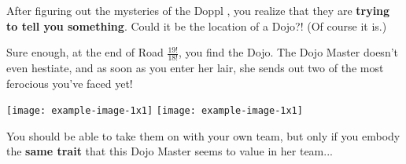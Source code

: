 

After figuring out the mysteries of the Doppl \mappMobimon{}, you realize
that they are \textbf{trying to tell you something}. Could it be the location of
a \mappMobimon{} Dojo?! (Of course it is.)

Sure enough, at the end of Road \(\frac{19!}{18!}\), you find the Dojo.
The Dojo Master doesn't even hestiate, and as soon as you enter her lair,
she sends out two of the most ferocious \mappMobimon{} you've faced yet!

\texttt{[image: example-image-1x1]}
\texttt{[image: example-image-1x1]}

You should be able to take them on with your own team, but only if you
embody the \textbf{same trait} that this Dojo Master seems to value in her
team...


